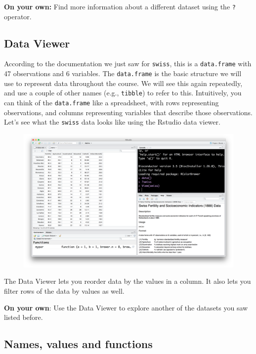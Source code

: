 \documentclass[12pt,]{book}
\theoremstyle{definition}
\theoremstyle{definition}
\theoremstyle{definition}
\theoremstyle{remark}
\begin{document}
\textbf{On your own:} Find more information about a different dataset
using the \texttt{?} operator.

\subsection{Data Viewer}\label{data-viewer}

According to the documentation we just saw for \texttt{swiss}, this is a
\texttt{data.frame} with 47 observations and 6 variables. The
\texttt{data.frame} is the basic structure we will use to represent data
throughout the course. We will see this again repeatedly, and use a
couple of other names (e.g., \texttt{tibble}) to refer to this.
Intuitively, you can think of the \texttt{data.frame} like a
spreadsheet, with rows representing observations, and columns
representing variables that describe those observations. Let's see what
the \texttt{swiss} data looks like using the Rstudio data viewer.

\begin{figure}
\centering
\includegraphics{img/rstudio_view_swiss.png}
\caption{}
\end{figure}

The Data Viewer lets you reorder data by the values in a column. It also
lets you filter rows of the data by values as well.

\textbf{On your own}: Use the Data Viewer to explore another of the
datasets you saw listed before.

\subsection{Names, values and
functions}\label{names-values-and-functions}
\end{document}

